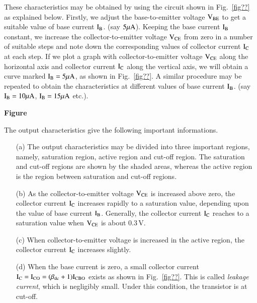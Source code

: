  These characteristics may be obtained by using the circuit shown in Fig.~\ref{fig??} as explained below. Firstly, we adjust the base-to-emitter voltage $\textrm{V}_{\text{BE}}$ to get a suitable value of base current $\textrm{I}_{\textrm{B}}$. (say $5\mu\textrm{A}$). Keeping the base current $\textrm{I}_{\textrm{B}}$ constant, we increase the collector-to-emitter voltage $\textrm{V}_{\text{CE}}$ from zero in a number of suitable steps and note down the corresponding values of collector current $\textrm{I}_{\textrm{C}}$ at each step. If we plot a graph with collector-to-emitter voltage $\textrm{V}_{\text{CE}}$ along the horizontal axis and collector current $\textrm{I}_{\textrm{C}}$ along the vertical axis, we will obtain a curve marked $\textrm{I}_{\textrm{B}}=5\mu\textrm{A}$, as shown in Fig.~\ref{fig??}. A similar procedure may be repeated to obtain the characteristics at different values of base current $\textrm{I}_{\textrm{B}}$. (say $\textrm{I}_{\textrm{B}}=10\mu\textrm{A}$, $\textrm{I}_{\textrm{B}}=15\mu\textrm{A}$ etc.).
\begin{center}
{\bf Figure}
\end{center}

The output characteristics give the following important informations.
\begin{itemize}
\item[(a)] The output characteristics may be divided into three important regions, namely, saturation region, active region and cut-off region. The saturation and cut-off regions are shown by the shaded areas, whereas the active region is the region between saturation and cut-off regions.

\item[(b)] As the collector-to-emitter voltage $\textrm{V}_{\text{CE}}$ is increased above zero, the collector current $\textrm{I}_{\textrm{C}}$ increases rapidly to a saturation value, depending upon the value of base current $\textrm{I}_{\textrm{B}}$. Generally, the collector current $\textrm{I}_{\textrm{C}}$ reaches to a saturation value when $\textrm{V}_{\text{CE}}$ is about 0.3\,V.

\item[(c)] When collector-to-emitter voltage is increased in the active region, the collector current $\textrm{I}_{\textrm{C}}$ increases slightly.

\item[(d)] When the base current is zero, a small collector current $\textrm{I}_{\textrm{C}}=\textrm{I}_{\text{CO}}=(\beta_{\text{dc}}+1)\textrm{I}_{\text{CBO}}$ exists as shown in Fig.~\ref{fig??}. This is called {\em leakage current}, which is negligibly small. Under this condition, the transistor is at cut-off.
\end{itemize}

